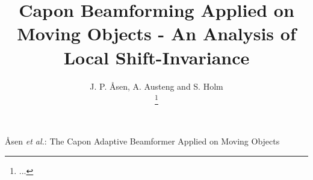 \documentclass[journal]{IEEEtran}
\begin{document}
%
\title{Capon Beamforming Applied on Moving Objects - An Analysis of Local Shift-Invariance}
%
%
%

\author{
   J. P. \AA{}sen, A. Austeng and S. Holm%
   
   \thanks{...}
}

% 
%



%
{\AA{}sen \MakeLowercase{\textit{et al.}}: The Capon Adaptive Beamformer Applied on Moving Objects }
% 
\end{document}
